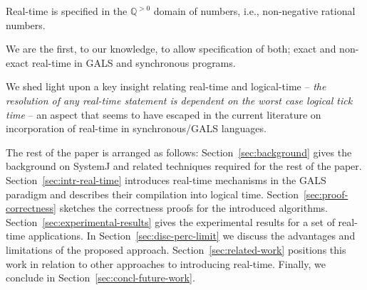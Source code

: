 \begin{enumerate*}
\item Real-time is specified in the $\mathbb{Q}^{>0}$ domain of numbers,
  i.e., non-negative rational numbers.
\item We are the first, to our knowledge, to allow specification of
  both; exact and non-exact real-time in GALS and synchronous programs.
\item We shed light upon a key insight relating real-time and
  logical-time -- \textit{the resolution of any real-time statement is
    dependent on the worst case logical tick time} -- an aspect that
  seems to have escaped in the current literature on incorporation of
  real-time in synchronous/GALS languages.
\end{enumerate*}

The rest of the paper is arranged as follows:
Section~\ref{sec:background} gives the background on SystemJ and related
techniques required for the rest of the
paper. Section~\ref{sec:intr-real-time} introduces real-time mechanisms
in the GALS paradigm and describes their compilation into logical
time. Section~\ref{sec:proof-correctness} sketches the correctness
proofs for the introduced
algorithms. Section~\ref{sec:experimental-results} gives the
experimental results for a set of real-time applications. In
Section~\ref{sec:disc-perc-limit} we discuss the advantages and
limitations of the proposed approach. Section~\ref{sec:related-work}
positions this work in relation to other approaches to introducing
real-time. Finally, we conclude in Section~\ref{sec:concl-future-work}.


